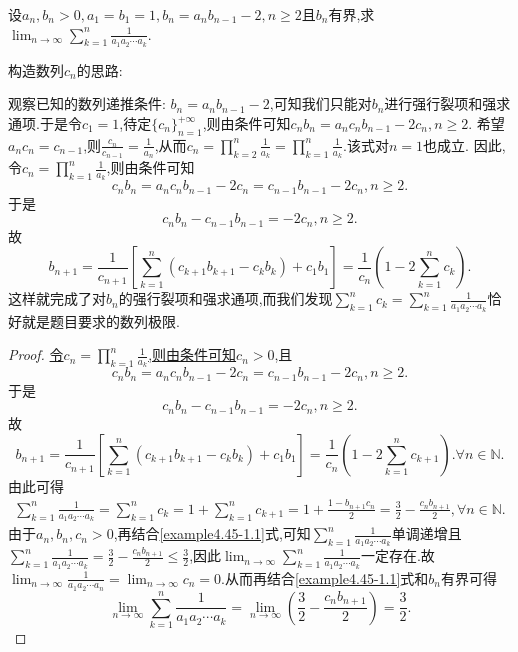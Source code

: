 \documentclass[../../main.tex]{subfiles}%
\begin{document}
\begin{example}
设\(a_n,b_n>0,a_1 = b_1 = 1,b_n=a_nb_{n - 1}-2,n\geqslant 2\)且\(b_n\)有界,求\(\lim_{n\rightarrow\infty}\sum_{k = 1}^{n}\frac{1}{a_1a_2\cdots a_k}\).
\end{example}
\begin{note}
\hypertarget{example4.45构造数列的思路}{构造数列$c_n$的思路:}观察已知的数列递推条件: \(b_n = a_nb_{n - 1} - 2\),可知我们只能对\(b_n\)进行强行裂项和强求通项.于是令\(c_1 = 1\),待定\(\{ c_n \}_{n = 1}^{+\infty}\),则由条件可知\(c_nb_n = a_nc_nb_{n - 1} - 2c_n, n\geqslant  2\).
希望\(a_nc_n = c_{n - 1}\),则\(\frac{c_n}{c_{n - 1}} = \frac{1}{a_n}\),从而\(c_n = \prod_{k = 2}^n{\frac{1}{a_k}} = \prod_{k = 1}^n{\frac{1}{a_k}}\).该式对\(n = 1\)也成立.
因此,令\(c_n = \prod_{k = 1}^n{\frac{1}{a_k}}\),则由条件可知
\[
c_nb_n = a_nc_nb_{n - 1} - 2c_n = c_{n - 1}b_{n - 1} - 2c_n, n\geqslant  2.
\]
于是
\[
c_nb_n - c_{n - 1}b_{n - 1} = -2c_n, n\geqslant  2.
\]
故
\[
b_{n + 1} = \frac{1}{c_{n + 1}}\left[ \sum_{k = 1}^n{(c_{k + 1}b_{k + 1} - c_kb_k)} + c_1b_1 \right] = \frac{1}{c_n}\left( 1 - 2\sum_{k = 1}^n{c_k} \right).
\]
这样就完成了对\(b_n\)的强行裂项和强求通项,而我们发现\(\sum_{k = 1}^n{c_k} = \sum_{k = 1}^n{\frac{1}{a_1a_2\cdots a_k}}\)恰好就是题目要求的数列极限.
\end{note}
\begin{proof}
\hyperlink{example4.45构造数列的思路}{令\(c_n = \prod_{k = 1}^n{\frac{1}{a_k}}\),则由条件可知\(c_n > 0\)},且
\[
c_nb_n = a_nc_nb_{n - 1} - 2c_n = c_{n - 1}b_{n - 1} - 2c_n, n\geqslant  2.
\]
于是
\[
c_nb_n - c_{n - 1}b_{n - 1} = -2c_n, n\geqslant  2.
\]
故
\[
b_{n + 1} = \frac{1}{c_{n + 1}}\left[ \sum_{k = 1}^n{(c_{k + 1}b_{k + 1} - c_kb_k)} + c_1b_1 \right] = \frac{1}{c_n}\left( 1 - 2\sum_{k = 1}^n{c_{k + 1}} \right). \forall n\in \mathbb{N}.
\]
由此可得
\begin{align}\label{example4.45-1.1}
\sum_{k = 1}^n{\frac{1}{a_1a_2\cdots a_k}} = \sum_{k = 1}^n{c_k} = 1 + \sum_{k = 1}^n{c_{k + 1}} = 1 + \frac{1 - b_{n + 1}c_n}{2} = \frac{3}{2} - \frac{c_nb_{n + 1}}{2}, \forall n\in \mathbb{N}.  
\end{align}
由于\(a_n, b_n, c_n > 0\),再结合\eqref{example4.45-1.1}式,可知\(\sum_{k = 1}^n{\frac{1}{a_1a_2\cdots a_k}}\)单调递增且\(\sum_{k = 1}^n{\frac{1}{a_1a_2\cdots a_k}} = \frac{3}{2} - \frac{c_nb_{n + 1}}{2} \leqslant  \frac{3}{2}\),因此\(\lim_{n\rightarrow \infty} \sum_{k = 1}^n{\frac{1}{a_1a_2\cdots a_k}}\)一定存在.故\(\lim_{n\rightarrow \infty} \frac{1}{a_1a_2\cdots a_n} = \lim_{n\rightarrow \infty} c_n = 0\).从而再结合\eqref{example4.45-1.1}式和\(b_n\)有界可得
\[
\lim_{n\rightarrow \infty} \sum_{k = 1}^n{\frac{1}{a_1a_2\cdots a_k}} = \lim_{n\rightarrow \infty} \left( \frac{3}{2} - \frac{c_nb_{n + 1}}{2} \right) = \frac{3}{2}.
\]
\end{proof}
\end{document}
